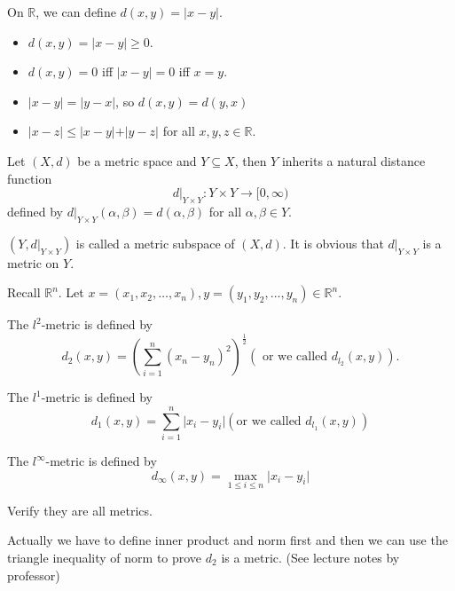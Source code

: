 \begin{eg}
    On \(\mathbb{R} \), we can define \(d(x,y) = \vert x - y \vert \).
\end{eg}
\begin{explanation}
        \begin{itemize}
        \item \(d(x, y) = \vert x - y \vert \ge 0 \). 
        \item \(d(x,y) = 0\) iff \(\vert x-y \vert = 0 \) iff \(x = y\). 
        \item \(\vert x-y \vert = \vert y-x \vert  \), so \(d(x,y) = d(y,x)\) 
        \item \(\vert x-z \vert \le \vert x-y \vert + \vert y-z \vert   \) for all \(x,y,z \in \mathbb{R} \).        
    \end{itemize}  
\end{explanation}

\begin{eg}
    Let \((X,d)\) be a metric space and \(Y \subseteq X\), then \(Y\) inherits a natural distance function  
    \[
        d \vert _{Y \times Y}: Y \times Y \to [0, \infty )
    \]   defined by \(d \vert _{Y \times Y} (\alpha , \beta ) = d(\alpha , \beta )\) for all \(\alpha , \beta \in Y\).  
\end{eg}
\begin{note}
    \((Y, d \vert _{Y \times Y})\) is called a metric subspace of \((X, d)\). It is obvious that \(d \vert _{Y \times Y}\) is a metric on \(Y\).    
\end{note}

Recall \(\mathbb{R} ^n\). Let \(x = (x_1, x_2, \dots , x_n) , y = (y_1, y_2, \dots , y_n) \in \mathbb{R} ^n\). 

\begin{definition}[\(l^2\)-metric]\label{def: l2metric}
    The \(l^2\)-metric is defined by 
    \[
        d_2(x,y) = \left( \sum_{i=1}^n (x_n - y_n)^2  \right)^{\frac{1}{2}} (\text{ or we called } d_{l_2}(x,y)).
    \] 
\end{definition}
\begin{definition}\label{def: l1-metric}
    The \(l^1\)-metric is defined by 
    \[
        d_1(x,y) = \sum_{i=1}^n \vert x_i - y_i \vert (\text{or we called } d_{l_1}(x,y))
    \] 
\end{definition}
    
\begin{definition}\label{def: linf-metric}
        The \(l^{\infty} \)-metric is defined by 
        \[
            d_\infty (x,y) = \max_{1 \le i \le n} \vert x_i - y_i \vert 
        \] 
\end{definition}

\begin{exercise}
    Verify they are all metrics.
\end{exercise}
\begin{note}
    Actually we have to define inner product and norm first and then we can use the triangle inequality of norm to prove \(d_2\) is a metric. (See lecture notes by professor)
\end{note}